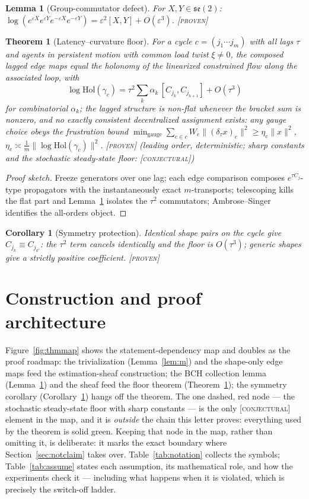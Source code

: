 \documentclass[letterpaper, 10pt, journal]{IEEEtran}
\newtheorem{theorem}{Theorem}\newtheorem{lemma}{Lemma}
\newtheorem{corollary}{Corollary}
\newcommand{\provtag}{\textsc{[proven]}}
\newcommand{\conjtag}{\textsc{[conjectural]}}
\begin{document}
\begin{lemma}[Group-commutator defect]\label{lem:bch}
For $X, Y \in \mathfrak{se}(2)$:
$\log(e^{\varepsilon X} e^{\varepsilon Y} e^{-\varepsilon X}
e^{-\varepsilon Y}) = \varepsilon^2 [X, Y] + O(\varepsilon^3)$. \provtag
\end{lemma}

\begin{theorem}[Latency--curvature floor]\label{thm:floor}
For a cycle $c = (j_1 \cdots j_m)$ with all lags $\tau$ and agents in
persistent motion with common load twist $\xi \ne 0$, the composed lagged
edge maps equal the holonomy of the linearized constrained flow along the
associated loop, with
\[
\log \mathrm{Hol}(\gamma_c) = \tau^2 \sum_k \alpha_k\,
[C_{j_k}, C_{j_{k+1}}] + O(\tau^3)
\]
for combinatorial $\alpha_k$; the lagged structure is non-flat whenever the
bracket sum is nonzero, and no exactly consistent decentralized assignment
exists: any gauge choice obeys the frustration bound
$\min_{\mathrm{gauge}} \sum_{e \in c} W_e \|(\delta_\tau x)_e\|^2 \ge
\eta_c \|x\|^2$, $\eta_c \asymp \tfrac{1}{m}\|\log
\mathrm{Hol}(\gamma_c)\|^2$. \provtag{} (leading order, deterministic;
sharp constants and the stochastic steady-state floor: \conjtag)
\end{theorem}
\begin{proof}[Proof sketch]
Freeze generators over one lag; each edge comparison composes
$e^{\tau C_j}$-type propagators with the instantaneously exact
$m$-transports; telescoping kills the flat part and Lemma~\ref{lem:bch}
isolates the $\tau^2$ commutators; Ambrose--Singer identifies the all-orders
object.
\end{proof}

\begin{corollary}[Symmetry protection]\label{cor:sym}
Identical shape pairs on the cycle give $C_{j_k} \equiv C_{j_{k'}}$: the
$\tau^2$ term cancels identically and the floor is $O(\tau^3)$; generic
shapes give a strictly positive coefficient. \provtag
\end{corollary}


\section{Construction and proof architecture}
Figure~\ref{fig:thmmap} shows the statement-dependency map and doubles as the
proof roadmap: the trivialization (Lemma~\ref{lem:m}) and the shape-only edge
maps feed the estimation-sheaf construction; the BCH collection lemma
(Lemma~\ref{lem:bch}) and the sheaf feed the floor theorem
(Theorem~\ref{thm:floor}); the symmetry corollary
(Corollary~\ref{cor:sym}) hangs off the theorem. The one dashed, red node ---
the stochastic steady-state floor with sharp constants --- is the only
\conjtag{} element in the map, and it is \emph{outside} the chain this letter
proves: everything used by the theorem is solid green. Keeping that node in
the map, rather than omitting it, is deliberate: it marks the exact boundary
where Section~\ref{sec:notclaim} takes over. Table~\ref{tab:notation}
collects the symbols; Table~\ref{tab:assume} states each assumption, its
mathematical role, and how the experiments check it --- including what
happens when it is violated, which is precisely the switch-off ladder.
\end{document}
